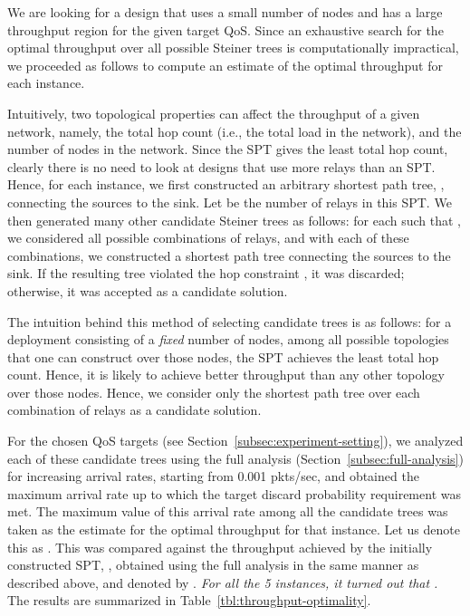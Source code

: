 \documentclass[12pt, draftclsnofoot, onecolumn]{IEEEtran}
\begin{document}
We are looking for a design that uses a small number of nodes and has a large throughput region for the given target QoS. Since an exhaustive search for the optimal throughput over all possible Steiner trees is computationally impractical, we proceeded as follows to compute an estimate of the optimal throughput for each instance.

Intuitively, two topological properties can affect the throughput of a given network, namely, the total hop count (i.e., the total load in the network), and the number of nodes in the network. Since the SPT gives the least total hop count, clearly there is no need to look at designs that use more relays than an SPT. Hence, for each instance, we first constructed an arbitrary shortest path tree, , connecting the sources to the sink. Let  be the number of relays in this SPT. We then generated many other candidate Steiner trees as follows: for each  such that , we considered all possible combinations of  relays, and with each of these combinations, we constructed a shortest path tree connecting the sources to the sink. If the resulting tree violated the hop constraint , it was discarded; otherwise, it was accepted as a candidate solution. 

The intuition behind this method of selecting candidate trees is as follows: for a deployment consisting of a \emph{fixed} number of nodes, among all possible topologies that one can construct over those nodes, the SPT achieves the least total hop count. Hence, it is likely to achieve better throughput than any other topology over those nodes. Hence, we consider only the shortest path tree over each combination of relays as a candidate solution. 

For the chosen QoS targets (see Section~\ref{subsec:experiment-setting}), we analyzed each of these candidate trees using the full analysis (Section~\ref{subsec:full-analysis}) for increasing arrival rates, starting from 0.001 pkts/sec, and obtained the maximum arrival rate up to which the target discard probability requirement was met. The maximum value of this arrival rate among all the candidate trees was taken as the estimate for the optimal throughput for that instance. Let us denote this as . This was compared against the throughput achieved by the initially constructed SPT, , obtained using the full analysis in the same manner as described above, and denoted by . \emph{For all the 5 instances, it turned out that .} The results are summarized in Table~\ref{tbl:throughput-optimality}.
\end{document}
